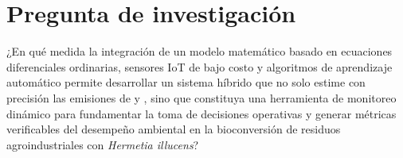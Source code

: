 \section{Pregunta de investigación}

¿En qué medida la integración de un modelo matemático basado en ecuaciones diferenciales ordinarias, sensores IoT de bajo costo y algoritmos de aprendizaje automático permite desarrollar un sistema híbrido que no solo estime con precisión las emisiones de  y , sino que constituya una herramienta de monitoreo dinámico para fundamentar la toma de decisiones operativas y generar métricas verificables del desempeño ambiental en la bioconversión de residuos agroindustriales con \textit{Hermetia illucens}?
